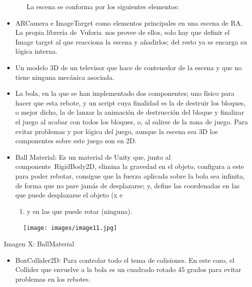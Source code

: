 
~ ~ ~ ~ La escena se conforma por los siguientes elementos:

\begin{itemize}
\item
  ARCamera e ImageTarget como elementos principales en una escena de RA.
  La propia librería de~Vuforia~nos provee de ellos, solo hay que
  definir el Image target al que reacciona la escena y añadirlos; del
  resto ya se encarga su lógica interna.
\item
  Un modelo 3D de un televisor que hace de contenedor de la escena y que
  no tiene ninguna mecánica asociada.
\item
  La bola, en la que se han implementado dos componentes; uno físico
  para hacer que esta rebote, y un script cuya finalidad es la de
  destruir los bloques, o mejor dicho, la de lanzar la animación de
  destrucción del bloque y finalizar el juego al acabar con todos los
  bloques, o, al salirse de la zona de juego. Para evitar problemas y
  por lógica del juego, aunque la escena sea 3D los componentes sobre
  este juego son en 2D.
\item
  Ball Material: Es un material de Unity que, junto al
  componente~RigidBody2D, elimina la gravedad en el objeto, configura a
  este para poder rebotar, consigue que la fuerza aplicada sobre la bola
  sea infinita, de forma que no pare jamás de desplazarse; y, define las
  coordenadas en las que puede desplazarse el objeto (x e

  \begin{enumerate}
  \def\labelenumi{\alph{enumi})}
  \setcounter{enumi}{24}
  \itemsep1pt\parskip0pt
  \item
    y en las que puede rotar (ninguna).
  \end{enumerate}
\end{itemize}

\begin{figure}[htbp]
\centering
\texttt{[image: images/image11.jpg]}
\end{figure}

Imagen X: BallMaterial

\begin{itemize}
\itemsep1pt\parskip0pt
\item
  BoxCollider2D: Para controlar todo el tema de colisiones. En este
  caso, el Collider que envuelve a la bola es un cuadrado rotado 45
  grados para evitar problemas en los rebotes.
\end{itemize}

